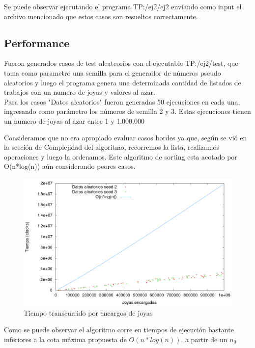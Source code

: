 Se puede observar ejecutando el programa TP:/ej2/ej2 enviando como input el archivo mencionado que estos casos son resueltos correctamente.

\subsection{Performance}

Fueron generados casos de test aleateorios con el ejecutable TP:/ej2/test, que toma como parametro una semilla para el generador de n\'umeros pseudo aleatorios y luego el programa genera una determinada cantidad de listados de trabajos con un numero de joyas y valores al azar.\\

Para los casos "Datos aleatorios" fueron generadas 50 ejecuciones en cada una, ingresando como par\'ametro los n\'umeros de semilla 2 y 3. Estas ejecuciones tienen un numero de joyas al azar entre 1 y 1.000.000

Consideramos que no era apropiado evaluar casos bordes ya que, seg\'un se vi\'o en la secci\'on de Complejidad del algoritmo, recorremos la lista, realizamos operaciones y luego la ordenamos. Este algoritmo de sorting esta acotado por O(n*log(n)) a\'un considerando peores casos.

\begin{center}
\begin{figure}[h!]
\includegraphics[scale=0.4]{./img/ej2_chart2.png}
\caption{Tiempo transcurrido por encargos de joyas}
\end{figure}
\end{center}

Como se puede observar el algoritmo corre en tiempos de ejecuci\'on bastante inferiores a la cota m\'axima propuesta de $O(n*log(n))$, a partir de un $n_{0}$
